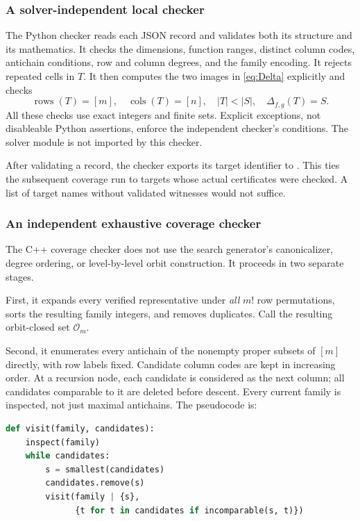 \documentclass[11pt,letterpaper]{article}
\numberwithin{equation}{section}
\theoremstyle{definition}
\theoremstyle{remark}
\newcommand{\suppR}{\operatorname{rows}}
\newcommand{\suppC}{\operatorname{cols}}
\begin{document}
\subsubsection{A solver-independent local checker}
The Python checker reads each JSON record and validates both its structure
and its mathematics. It checks the dimensions, function ranges, distinct
column codes, antichain conditions, row and column degrees, and the family
encoding. It rejects repeated cells in $T$. It then computes the two
images in \eqref{eq:Delta} explicitly and checks
\[
 \suppR(T)=[m],\quad\suppC(T)=[n],\quad |T|<|S|,
 \quad\Delta_{f,g}(T)=S.
\]
All these checks use exact integers and finite sets. Explicit exceptions,
not disableable Python assertions, enforce the independent checker's
conditions. The solver module is not imported by this checker.

After validating a record, the checker exports its target identifier to
. This ties the subsequent coverage run
to targets whose actual certificates were checked. A list of target names
without validated witnesses would not suffice.

\subsubsection{An independent exhaustive coverage checker}
\label{sec:db-shared-coverage}
The C++ coverage checker does not use the search generator's canonicalizer,
degree ordering, or level-by-level orbit construction. It proceeds in two
separate stages.

First, it expands every verified representative under \emph{all} $m!$ row
permutations, sorts the resulting family integers, and removes duplicates.
Call the resulting orbit-closed set $\mathcal O_m$.

Second, it enumerates every antichain of the nonempty proper subsets of
$[m]$ directly, with row labels fixed. Candidate column codes are kept in
increasing order. At a recursion node, each candidate is considered as the
next column; all candidates comparable to it are deleted before descent.
Every current family is inspected, not just maximal antichains. The
pseudocode is:
\begin{lstlisting}[language=Python]
def visit(family, candidates):
    inspect(family)
    while candidates:
        s = smallest(candidates)
        candidates.remove(s)
        visit(family | {s},
              {t for t in candidates if incomparable(s, t)})
\end{lstlisting}
\end{document}
